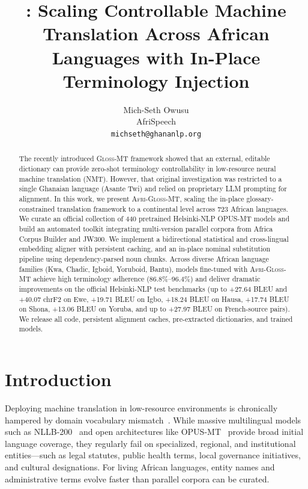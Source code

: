 \documentclass[10pt,twocolumn]{article}
\title{\agm: Scaling Controllable Machine Translation Across African Languages with In-Place Terminology Injection}
\author{%
Mich-Seth Owusu\\[4pt]
AfriSpeech\\
\texttt{michseth@ghananlp.org}
}
\date{}
\newcommand{\gm}{\textsc{Gloss-MT}}
\newcommand{\agm}{\textsc{Afri-Gloss-MT}}
\begin{document}
\maketitle

\begin{abstract}
The recently introduced \gm{} framework showed that an external, editable dictionary can provide zero-shot terminology controllability in low-resource neural machine translation (NMT). However, that original investigation was restricted to a single Ghanaian language (Asante Twi) and relied on proprietary LLM prompting for alignment. In this work, we present \agm{}, scaling the in-place glossary-constrained translation framework to a continental level across 723 African languages. We curate an official collection of 440 pretrained Helsinki-NLP OPUS-MT models and build an automated toolkit integrating multi-version parallel corpora from Africa Corpus Builder and JW300. We implement a bidirectional statistical and cross-lingual embedding aligner with persistent caching, and an in-place nominal substitution pipeline using dependency-parsed noun chunks. Across diverse African language families (Kwa, Chadic, Igboid, Yoruboid, Bantu), models fine-tuned with \agm{} achieve high terminology adherence (86.8\%--96.4\%) and deliver dramatic improvements on the official Helsinki-NLP test benchmarks (up to +27.64 BLEU and +40.07 chrF2 on Ewe, +19.71 BLEU on Igbo, +18.24 BLEU on Hausa, +17.74 BLEU on Shona, +13.06 BLEU on Yoruba, and up to +27.97 BLEU on French-source pairs). We release all code, persistent alignment caches, pre-extracted dictionaries, and trained models.
\end{abstract}

\section{Introduction}

Deploying machine translation in low-resource environments is chronically hampered by domain vocabulary mismatch~\cite{adelani2022few}. While massive multilingual models such as NLLB-200~\cite{nllb2022} and open architectures like OPUS-MT~\cite{tiedemann2020opus} provide broad initial language coverage, they regularly fail on specialized, regional, and institutional entities---such as legal statutes, public health terms, local governance initiatives, and cultural designations. For living African languages, entity names and administrative terms evolve faster than parallel corpora can be curated. 
\end{document}
